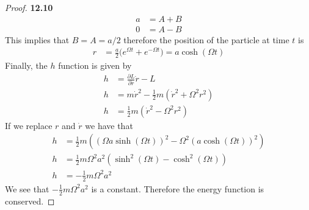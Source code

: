 \documentclass[11pt]{article}
\theoremstyle{definition}
\begin{document}
\begin{proof}{\textbf{12.10}}
\begin{align*}
        a &= A + B\\
        0 &= A - B
    \end{align*}
    This implies that $B = A = a/2$ therefore the position of the particle at
    time $t$ is 
    \begin{align*}
        r &= \frac{a}{2}\bigg(e^{\Omega t} + e^{-\Omega t}\bigg)
        = a\cosh(\Omega t)
    \end{align*}
    Finally, the $h$ function is given by
    \begin{align*}
        h &= \frac{\partial L}{\partial \dot{r}} \dot{r} - L\\
        h &= m\dot{r}^2 - \frac{1}{2}m (\dot{r}^2 + \Omega^2 r^2)\\
        h &= \frac{1}{2}m (\dot{r}^2 - \Omega^2 r^2)
    \end{align*}
    If we replace $r$ and $\dot{r}$ we have that
    \begin{align*}
        h &= \frac{1}{2}m ((\Omega a\sinh(\Omega t))^2 - \Omega^2 (a\cosh(\Omega t))^2)\\
        h &= \frac{1}{2}m\Omega^2a^2(\sinh^2(\Omega t) -\cosh^2(\Omega t))\\
        h &= -\frac{1}{2}m\Omega^2a^2
    \end{align*}
    We see that $-\frac{1}{2}m\Omega^2a^2$ is a constant.
    Therefore the energy function is conserved.
\end{proof}
\cleardoublepage
\end{document}
